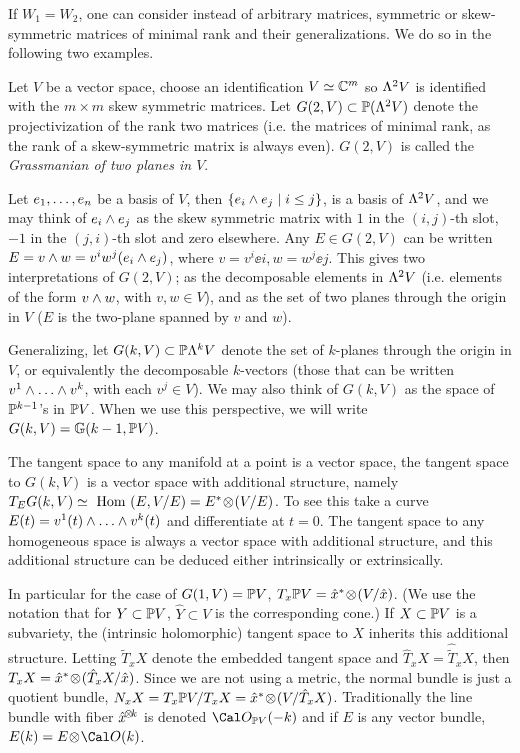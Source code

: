 \smallpagebreak
 If $W_1=W_2$, 
one can consider instead of arbitrary matrices, symmetric or
skew-symmetric matrices of minimal rank and their generalizations.
We do so in the following two examples.


Let $V$ be a vector space, choose an identification
$V\simeq \Bbb C^{m}$ so  $\Lambda^{2}V$ is identified with
the $m\times m$ skew symmetric matrices. Let $G(2,V)\subset\Bbb P( \Lambda^{2}
V)$ denote the 
projectivization of the rank two matrices (i.e. the
matrices of minimal rank, as the rank of a skew-symmetric
matrix is always even). $G(2,V)$ is called the {\it Grassmanian
of two planes in $V$}. 

Let
$e_{1}, \hdots ,e_{n}$ be a basis of $V$,
then $\{e_{i}\wedge e_{j}\mid i\leq j\}$, is a
basis of $\Lambda^{2} V$, and we may think of $e_{i}\wedge e_{j}$ as the
skew symmetric matrix with $1$ in the $(i,j)$-th slot,
$-1$ in the $(j,i)$-th slot and zero elsewhere. Any
$E\in G(2,V)$ can be written $E= 
v\wedge w=v^iw^j(e_{i}\wedge e_{j})$,
where $v=v^i\ee i, w= w^j\ee j$. This gives two interpretations of $G(2,V)$;
as the decomposable elements in $\Lambda^{2}V$
(i.e. elements of the form $v\wedge w$, with
$v,w\in V$), and as the set of two
planes through the origin in $V$ ($E$ is the two-plane spanned by $v$ and
$w$).

Generalizing, let $G(k,V)\subset\Bbb P \Lambda^{k} V$ denote the set of $k$-planes
through the origin in $V$, or equivalently the decomposable $k$-vectors
(those that can be written $v^1\wedge\hdots\wedge v^k$,
with  each $v^j\in V$). We may also
think of $G(k,V)$ as the space of $\Bbb P^{k-1}$'s in $\Bbb P V$. When
we use this perspective, we will write $G(k,V)=\Bbb G(k-1,\Bbb P V)$.

The tangent space to any manifold at a point is a vector space,
the tangent space to $G(k,V)$ is a vector space with additional
structure, namely $T_EG(k,V)\simeq \text{ Hom } (E,V/E)= E^*\!\otimes\! (V/E)$.
 To see this take a curve $E(t)= v^1(t)\wedge\hdots\wedge v^k(t)$
and differentiate at $t=0$. 
The tangent space to any homogeneous space is always a vector
space with additional structure, and this additional structure
can be deduced either intrinsically or extrinsically.

In particular for the case of $G(1,V)=\Bbb P V$, 
  $T_x\Bbb P V= \hat x^*\!\otimes\! (V/\hat x)$. (We use the notation
that for $Y\subset\Bbb P V$, $\hat Y\subset V$ is the corresponding cone.)
If $X\subset\Bbb P V$ is a subvariety, the (intrinsic holomorphic) tangent
space to $X$ inherits this additional structure. Letting
$\tilde T_xX$ denote the embedded tangent space and
$\hat T_xX= \hat{\tilde T}_xX$,  then   $T_xX= \hat x^*\!\otimes\! 
(\hat T_xX/\hat x)$.
Since we are not using a metric, the normal bundle is just a quotient
bundle, $N_xX= T_x\Bbb P V/T_xX = \hat x^*\!\otimes\! (V/\hat T_xX)$. Traditionally
the line bundle with fiber $\hat x^{\!\otimes\! k}$ is denoted $\Cal O_{\ppp
V}(-k)$
and if $E$ is any vector bundle, $E(k)=E\ot \Cal O(k)$. 

